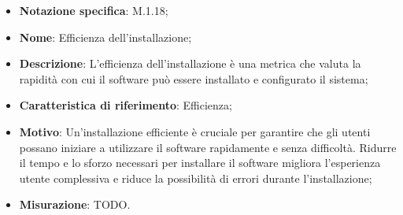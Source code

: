 \begin{itemize}
    \item \textbf{Notazione specifica}: M.1.18;
    \item \textbf{Nome}: Efficienza dell'installazione;
    \item \textbf{Descrizione}: L'efficienza dell'installazione è una metrica che valuta la rapidità con cui il software può essere installato e configurato il sistema;
    \item \textbf{Caratteristica di riferimento}: Efficienza;
    \item \textbf{Motivo}: Un'installazione efficiente è cruciale per garantire che gli utenti possano iniziare a utilizzare il software rapidamente e senza difficoltà. Ridurre il tempo e lo sforzo necessari per installare il software migliora l'esperienza utente complessiva e riduce la possibilità di errori durante l'installazione;
    \item \textbf{Misurazione}: TODO.
\end{itemize}
